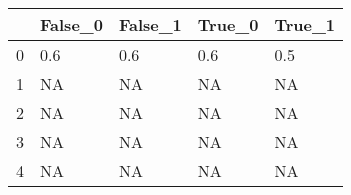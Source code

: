 \begin{tabular}{lllll}
\toprule
{} & False\_0 & False\_1 & True\_0 & True\_1 \\ \hline
\midrule
0 &     0.6 &     0.6 &    0.6 &    0.5 \\ \hline
1 &      NA &      NA &     NA &     NA \\ \hline
2 &      NA &      NA &     NA &     NA \\ \hline
3 &      NA &      NA &     NA &     NA \\ \hline
4 &      NA &      NA &     NA &     NA \\ \hline
\bottomrule
\end{tabular}
